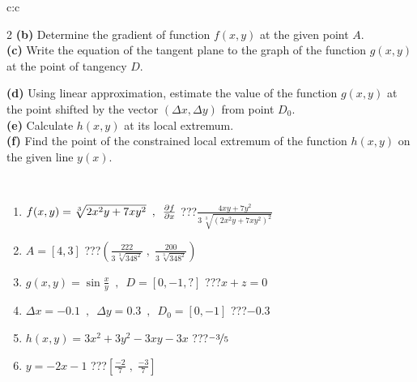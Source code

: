 \documentclass[10pt]{report}
\begin{document}
\begin{tabular}{c:c}
\begin{minipage}[c][104.5mm][t]{0.5\linewidth}
\begin{center}
\begin{minipage}{0.95\linewidth}
\begin{center}
{\begin{multicols}{2}
\textbf{(b)} Determine the gradient of function \(f(x,y)\) at the given point \(A\). \\[1mm]
\textbf{(c)} Write the equation of the tangent plane to the graph of the function \(g(x,y)\) at the point of tangency \(D\). \par \columnbreak
\textbf{(d)} Using linear approximation, estimate the value of the function \(g(x,y)\) at the point shifted by the vector \((\Delta x, \Delta y)\) from point \(D_0\). \\[1mm]
\textbf{(e)} Calculate \(h(x,y)\) at its local extremum. \\[1mm]
\textbf{(f)} Find the point of the constrained local extremum of the function \(h(x,y)\) on the given line \(y(x)\). \\[1mm]
\end{multicols}
}
\end{center}
\end{minipage}
\\[4mm]
\begin{minipage}{0.79\linewidth}
\begin{center}
\begin{varwidth}{\linewidth}
\begin{enumerate}
\normalsizerr
\item $f(x,y) = \sqrt[3]{2x^2y + 7xy^2}\enspace , \enspace \pdv{f}{x}$\quad \dotfill\; ???\;\dotfill \quad $\frac{4xy+7y^2}{3\,\sqrt[3]{(2x^2y+7xy^2)^{2}}}$
\item $A = [4, 3]$\quad \dotfill\; ???\;\dotfill \quad $\left( \frac{222}{3\,\sqrt[3]{348^2}} \;,\; \frac{200}{3\,\sqrt[3]{348^2}} \right)$
\item $g(x,y) = \sin\frac{x}{y} \enspace , \enspace D = [0, -1, ?]$\quad \dotfill\; ???\;\dotfill \quad $x+z=0$
\item $\Delta x = {-0.1} \enspace,\enspace \Delta y = {0.3} \enspace,\enspace D_0 = [0,-1]$\quad \dotfill\; ???\;\dotfill \quad $-0.3$
\item $h(x,y) = 3x^2+3y^2-3xy-3x$\quad \dotfill\; ???\;\dotfill \quad $\nicefrac{-3}{5}$
\item $y = -2x-1$\quad \dotfill\; ???\;\dotfill \quad $\left[\frac{-2}{7}\;,\;\frac{-3}{7}\right]$
\end{enumerate}
\end{varwidth}
\end{center}
\end{minipage}
\begin{minipage}{0.20\linewidth}
\begin{center}

\end{center}
\end{minipage}
\end{center}
\end{minipage}
\end{tabular}
\end{document}
